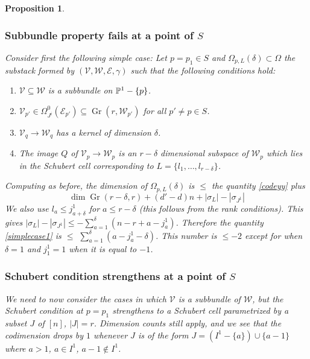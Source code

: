 \documentclass[11pt]{amsart}
\newcommand\me{\mathcal{E}}
\newcommand\mv{\mathcal{V}}
\newcommand\mw{\mathcal{W}}
\newcommand\Gr{\operatorname{Gr}}
\newtheorem{proposition}[theorem]{Proposition}
\numberwithin{theorem}{subsection}
\begin{document}
{\begin{proposition}
\subsubsection{Subbundle property fails at a point of $S$}\label{bruck02}
Consider first the following simple case: Let $p=p_1\in S$ and $\Omega_{p,L}(\delta)\subset \Omega$ the substack formed by
$(\mv,\mw,\me,\gamma)$ such that the following conditions hold:
\begin{enumerate}
\item[(a)] $\mv\subseteq \mw$ is a subbundle on $\Bbb{P}^1-\{p\}$.
\item[(b)]   $\mv_{p'}\in \Omega^0_{J^i}(\me_{p'})\subseteq \Gr(r,\mw_{p'})$ for all $p'\neq p\in S$.
\item[(c)] $\mv_q\to\mw_q$ has a kernel of dimension $\delta$.
\item[(d)] The image $Q$ of $\mv_p\to\mw_p$ is an $r-\delta$ dimensional subspace of $\mw_p$ which lies in the Schubert cell  corresponding to $L=\{l_1,\dots,l_{r-\delta}\}$.
\end{enumerate}

Computing as before, the dimension of  $\Omega_{p,L}(\delta)$ is $\leq$ the quantity \eqref{codeyy} plus
\begin{equation}\label{simplecase1}
\dim \Gr(r-\delta,r)+ (d'-d)n + |\sigma_L|-|\sigma_{J^1}|
\end{equation}
We also use $l_a\leq j^1_{a+\delta}$ for $a\leq r-\delta$ (this follows from the rank conditions).  This gives  $|\sigma_L|-|\sigma_{J^1}|\leq -\sum_{a=1}^{\delta} (n-r+a-j^1_a)$. Therefore the quantity \eqref{simplecase1} is $\leq$
$\sum_{a=1}^{\delta} (a-j^1_a-\delta)$. This number is $\leq -2$ except for when $\delta=1$ and $j^1_1=1$ when it is equal to $-1$.

\subsubsection{Schubert condition strengthens at a point of $S$}\label{bruck03}
We need to now consider the cases in which $\mv$ is a subbundle of $\mw$, but the Schubert condition at $p=p_1$ strengthens to a Schubert cell parametrized by a subset $J$ of $[n]$, $|J|=r$. Dimension counts still apply, and we see that the codimension drops by $1$ whenever $J$ is of the form $J=(I^1-\{a\})\cup \{a-1\}$ where $a>1$, $a\in I^1$, $a-1\not\in I^1$.

\end{proposition}}
\end{document}
